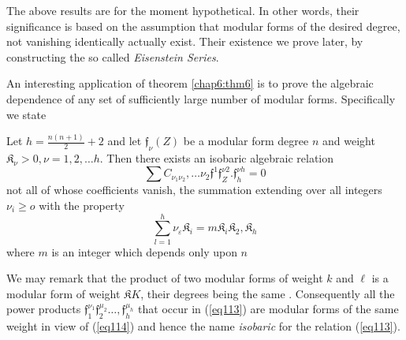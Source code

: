 The above results are for the moment hypothetical. In other words,
their significance is based on the assumption that modular forms of
the desired degree, not vanishing identically actually exist. Their
existence we prove later, by constructing the so called \textit{
  Eisenstein Series}. 

An interesting application of theorem \ref{chap6:thm6} is to prove the
algebraic dependence of any set of sufficiently large number of
modular forms. Specifically we state  


\begin{thm}\label{chap6:thm7} %
 Let $h = \frac{n(n+1)}{2}+2$ and let $\mathfrak{f}_{\nu}(Z)$ be
  a modular form degree $n$ and weight $\mathfrak{K}_{\nu} > 0, \nu =
  1,2, \ldots h$. Then  there exists an isobaric algebraic relation 
\begin{equation*}
\sum C_{\nu_1 \nu_2} , \ldots \nu_2 \mathfrak{f}^{1} \mathfrak{f}^{\nu
  2}_Z.\mathfrak{f}^{\nu h}_{h } = 0 \tag{113}\label{eq113}      
\end{equation*}
not all of whose coefficients vanish, the summation extending
   over all integers $\nu_{i} \geq o$ with the property 
\begin{equation*}
\sum^h_{l =1} \nu_{\varepsilon} \mathfrak{K}_i =
m\mathfrak{K}_i\mathfrak{K}_2,\mathfrak{K}_h \tag{114}\label{eq114}  
\end{equation*}
where $m$ is an integer which depends only upon $n$
\end{thm}

We may remark that the product of two modular forms of weight $k$ and
$\ell$ is a modular form of weight $\mathfrak{K} K$, their degrees being the
same . Consequently all the power products $\mathfrak{f}^{\nu_1}_1
\mathfrak{f}^{\mu_2}_2 \ldots , \mathfrak{f}^{\mu_h}_h$ that
occur in (\ref{eq113}) are modular forms of the same weight in view of
(\ref{eq114}) and hence the name \textit{isobaric} for the relation
(\ref{eq113}). 


